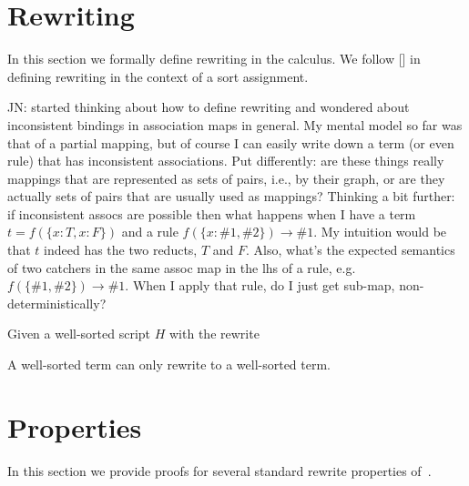 \documentclass[letterpaper,11pt]{article}
\newcommand{\JN}[1]{\textcolor{orange!70!black}{JN: #1}}
\begin{document}

\section{Rewriting}
\label{sec:rewriting}

In this section we formally define rewriting in the \hax calculus. We follow [] in
defining rewriting in the context of a sort assignment.

\JN{started thinking about how to define rewriting and wondered about inconsistent bindings in
  association maps in general. My mental model so far was that of a partial mapping, but of course I
  can easily write down a term (or even rule) that has inconsistent associations. Put differently:
  are these things really mappings that are represented as sets of pairs, i.e., by their graph, or
  are they actually sets of pairs that are usually used as mappings? Thinking a bit further: if
  inconsistent assocs are possible then what happens when I have a term $t = f(\{x: T, x: F\})$ and
  a rule $f(\{x : \#1, \#2\}) \to \#1$. My intuition would be that $t$ indeed has the two reducts,
  $T$ and $F$. Also, what's the expected semantics of two catchers in the same assoc map in the lhs
  of a rule, e.g.\ $f(\{\#1,\#2\}) \to \#1$. When I apply that rule, do I just get sub-map,
  non-deterministically?}

\begin{definition}[substitution]
  
\end{definition}


\begin{theorem}
  Given a well-sorted \hax script $H$ with the rewrite 


A well-sorted term can only rewrite to a well-sorted term.
\end{theorem}


\section{Properties}
\label{sec:properties}

In this section we provide proofs for several standard rewrite properties of~\hax.
\end{document}
